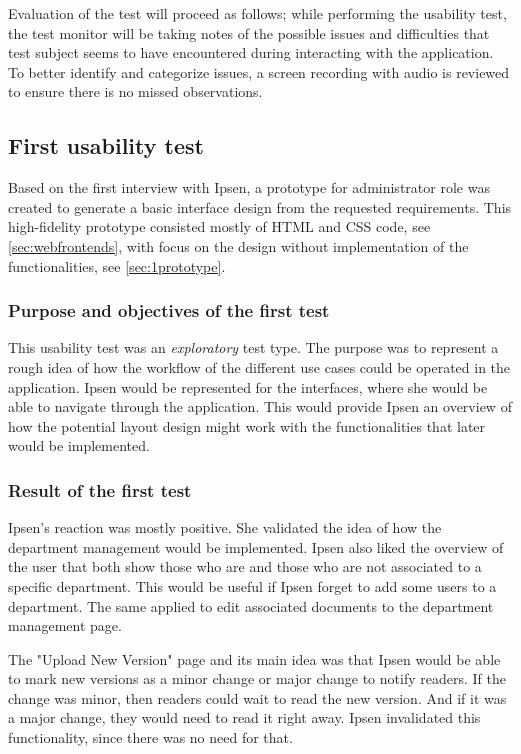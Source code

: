 \documentclass[../../master.tex]{subfiles}
\begin{document}
Evaluation of the test will proceed as follows; while performing the usability test, the test monitor will be taking notes of the possible issues and difficulties that test subject seems to have encountered during interacting with the application.
To better identify and categorize issues, a screen recording with audio is reviewed to ensure there is no missed observations.

\subsection{First usability test}\label{firsttest}
Based on the first interview with Ipsen, a prototype for administrator role was created to generate a basic interface design from the requested requirements.
This high-fidelity prototype consisted mostly of HTML and CSS code, see \cref{sec:webfrontends}, with focus on the design without implementation of the functionalities, see \cref{sec:1prototype}.

\subsubsection*{Purpose and objectives of the first test}
This usability test was an \textit{exploratory} test type.
The purpose was to represent a rough idea of how the workflow of the different use cases could be operated in the application.
Ipsen would be represented for the interfaces, where she would be able to navigate through the application.
This would provide Ipsen an overview of how the potential layout design might work with the functionalities that later would be implemented.

\subsubsection*{Result of the first test}
Ipsen's reaction was mostly positive.
She validated the idea of how the department management would be implemented.
Ipsen also liked the overview of the user that both show those who are and those who are not associated to a specific department.
This would be useful if Ipsen forget to add some users to a department.
The same applied to edit associated documents to the department management page.

The "Upload New Version" page and its main idea was that Ipsen would be able to mark new versions as a minor change or major change to notify readers.
If the change was minor, then readers could wait to read the new version.
And if it was a major change, they would need to read it right away.
Ipsen invalidated this functionality, since there was no need for that.
\end{document}

